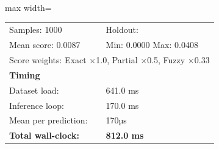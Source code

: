 \begin{table}[htbp]
\begin{adjustbox}{max width=\textwidth}
\begin{tabular}{r p{5cm} r r r r}
\midrule
\multicolumn{3}{l}{Samples: 1000} & \multicolumn{3}{l}{Holdout: } \\
\multicolumn{3}{l}{Mean score: 0.0087} & \multicolumn{3}{l}{Min: 0.0000 \quad Max: 0.0408} \\
\multicolumn{6}{l}{Score weights: Exact $\times$1.0, Partial $\times$0.5, Fuzzy $\times$0.33} \\
\midrule
\multicolumn{6}{l}{\textbf{Timing}} \\
\midrule
\multicolumn{3}{l}{Dataset load:} & \multicolumn{3}{l}{641.0 ms} \\
\multicolumn{3}{l}{Inference loop:} & \multicolumn{3}{l}{170.0 ms} \\
\multicolumn{3}{l}{Mean per prediction:} & \multicolumn{3}{l}{170µs} \\
\multicolumn{3}{l}{\textbf{Total wall-clock:}} & \multicolumn{3}{l}{\textbf{812.0 ms}} \\
\bottomrule
\end{tabular}
\end{adjustbox}
\end{table}
